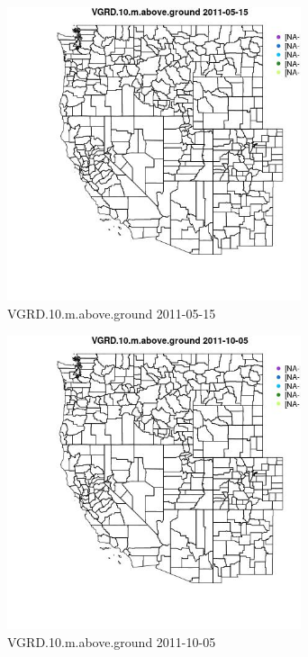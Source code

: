 \begin{figure} 
\centering  
\includegraphics[width=0.77\textwidth]{Code_Outputs/ML_input_report_ML_input_PM25_Step5_part_d_de_duplicated_aves_ML_input_MapObsVGRD10maboveground2011-05-15.jpg} 
\caption{\label{fig:ML_input_report_ML_input_PM25_Step5_part_d_de_duplicated_aves_ML_inputMapObsVGRD10maboveground2011-05-15}VGRD.10.m.above.ground 2011-05-15} 
\end{figure} 
 

\begin{figure} 
\centering  
\includegraphics[width=0.77\textwidth]{Code_Outputs/ML_input_report_ML_input_PM25_Step5_part_d_de_duplicated_aves_ML_input_MapObsVGRD10maboveground2011-10-05.jpg} 
\caption{\label{fig:ML_input_report_ML_input_PM25_Step5_part_d_de_duplicated_aves_ML_inputMapObsVGRD10maboveground2011-10-05}VGRD.10.m.above.ground 2011-10-05} 
\end{figure} 
 

